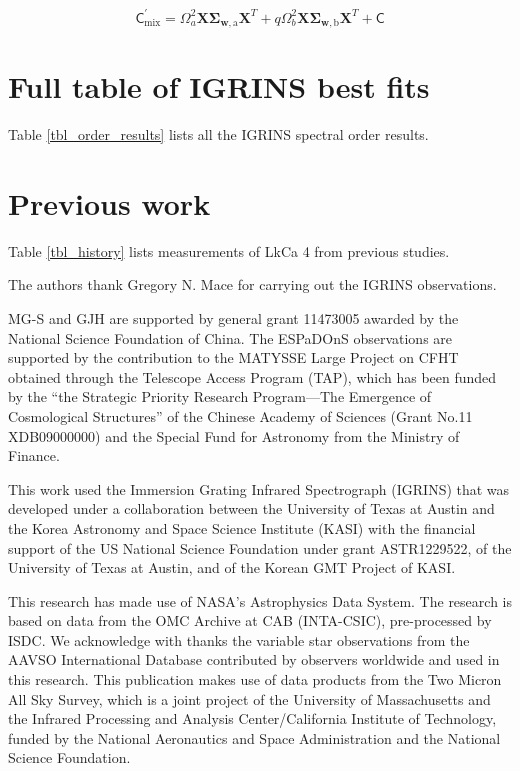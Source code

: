 \documentclass[twocolumn]{emulateapj}%
\newcommand{\name}{LkCa 4 }
\begin{document}
\begin{equation}
  \mathsf{C}_{\mathrm{mix}}^\prime = \Omega_a^2 \mathbf{X} \mathbf{\Sigma}_\mathbf{w, \mathrm{a}} \mathbf{X}^T + q \Omega_b^2 \mathbf{X} \mathbf{\Sigma}_\mathbf{w, \mathrm{b}} \mathbf{X}^T + \mathsf{C}
  \label{eqn:modC}
\end{equation}


\section{Full table of IGRINS best fits}

Table \ref{tbl_order_results} lists all the IGRINS spectral order results.
\LongTables


\section{Previous work}

Table \ref{tbl_history} lists measurements of \name from previous studies.




\acknowledgements
The authors thank Gregory N. Mace for carrying out the IGRINS observations. 

MG-S and GJH are supported by general grant 11473005 awarded by the National Science Foundation of China.   The ESPaDOnS observations are supported by the contribution to the MATYSSE Large Project on CFHT obtained through the Telescope Access Program (TAP), which has been funded by the ``the Strategic Priority Research Program---The Emergence of Cosmological Structures'' of the Chinese Academy of Sciences (Grant No.11 XDB09000000) and the Special Fund for Astronomy from the Ministry of Finance. 

This work used the Immersion Grating Infrared Spectrograph (IGRINS) that was developed under a collaboration between the University of Texas at Austin and the Korea Astronomy and Space Science Institute (KASI) with the financial support of the US National Science Foundation under grant ASTR1229522, of the University of Texas at Austin, and of the Korean GMT Project of KASI.

This research has made use of NASA's Astrophysics Data System.  The research is based on data from the OMC Archive at CAB (INTA-CSIC), pre-processed by ISDC.
We acknowledge with thanks the variable star observations from the AAVSO International Database contributed by observers worldwide and used in this research.
This publication makes use of data products from the Two Micron All Sky Survey, which is a joint project of the University of Massachusetts and the Infrared Processing and Analysis Center/California Institute of Technology, funded by the National Aeronautics and Space Administration and the National Science Foundation.
\end{document}
